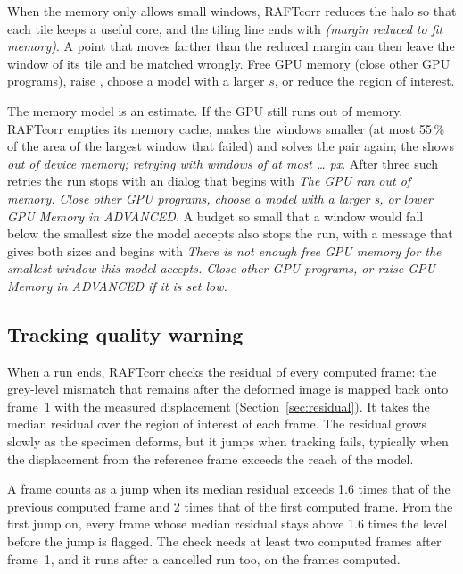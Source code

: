 \begin{warnbox}
When the memory only allows small windows, RAFTcorr reduces the halo so that each tile keeps a
useful core, and the tiling line ends with \emph{(margin reduced to fit memory)}. A point that
moves farther than the reduced margin can then leave the window of its tile and be matched
wrongly. Free GPU memory (close other GPU programs), raise , choose a model with a
larger $s$, or reduce the region of interest.
\end{warnbox}

The memory model is an estimate. If the GPU still runs out of memory, RAFTcorr empties its memory
cache, makes the windows smaller (at most 55\,\% of the area of the largest window that failed) and
solves the pair again; the  shows \emph{out of device memory; retrying with windows of at
most \ldots{} px}. After three such retries the run stops with an  dialog
that begins with \emph{The GPU ran out of memory. Close other GPU programs, choose a model with a
larger s, or lower GPU Memory in ADVANCED.} A budget so small that a window would fall below the
smallest size the model accepts also stops the run, with a message that gives both sizes and
begins with \emph{There is not enough free GPU memory for the smallest window this model accepts.
Close other GPU programs, or raise GPU Memory in ADVANCED if it is set low.}

\subsection{Tracking quality warning}
\label{sec:tracking-quality}

When a run ends, RAFTcorr checks the residual of every computed frame: the grey-level mismatch
that remains after the deformed image is mapped back onto frame~1 with the measured displacement
(Section~\ref{sec:residual}). It takes the median residual over the region of interest of each
frame. The residual grows slowly as the specimen deforms, but it jumps when tracking fails,
typically when the displacement from the reference frame exceeds the reach of the model.

A frame counts as a jump when its median residual exceeds 1.6 times that of the previous computed
frame and 2 times that of the first computed frame. From the first jump on, every frame whose
median residual stays above 1.6 times the level before the jump is flagged. The check needs at
least two computed frames after frame~1, and it runs after a cancelled run too, on the frames
computed.

